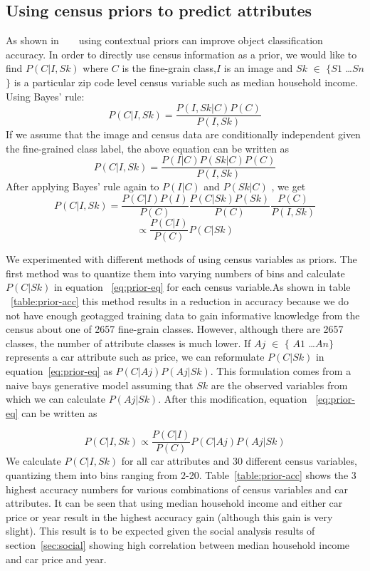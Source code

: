 \documentclass[10pt,twocolumn,letterpaper]{article}
\begin{document}
\subsection{Using census priors to predict attributes}
\label{sec:prior-att}
As shown in ~\cite{birdsnap} ~\cite{Other context stuff} using contextual priors can improve object classification accuracy. In order to directly use census information as a prior, we would like to find \(P(C|I,Sk)\) where \(C\) is the fine-grain class,\(I\) is an image and \(Sk\) \(\in\) \(\{\)\(S1\) \ldots \(Sn\)\(\}\) is a particular zip code level census variable such as median household income. Using Bayes' rule:
\begin{equation}
P(C|I,Sk)=\frac{P(I,Sk|C)P(C)}{P(I,Sk)}
\end{equation}
If we assume that the image and census data are conditionally independent given the fine-grained class label, the above equation can be written as 
\begin{equation}
P(C|I,Sk)=\frac{P(I|C)P(Sk|C)P(C)}{P(I,Sk)}
\end{equation}
After applying Bayes' rule again to \(P(I|C)\) and \(P(Sk|C)\) , we get 
\begin{equation}
P(C|I,Sk)=\frac{P(C|I)P(I)}{P(C)}\frac{P(C|Sk)P(Sk)}{P(C)} \frac{P(C)}{P(I,Sk)}
\end{equation}
\begin{equation}
\propto \frac{P(C|I)}{P(C)}P(C|Sk)
\label{eq:prior-eq}
\end{equation}

We experimented with different methods of using census variables as priors. The first method was to quantize them into varying numbers of bins and calculate \(P(C|Sk)\) in equation ~\ref{eq:prior-eq} for each census variable.As shown in table ~\ref{table:prior-acc} this method results in a reduction in accuracy because we do not have enough geotagged training data to gain informative knowledge from the census about one of 2657 fine-grain classes. However, although there are 2657 classes, the number of attribute classes is much lower. If \(Aj\) \(\in\) \(\{\) \(A1\) \ldots \(An\)\(\}\) represents a car attribute such as price, we can reformulate \(P(C|Sk)\) in equation~\ref{eq:prior-eq} as \(P(C|Aj)\)\(P(Aj|Sk)\). This formulation comes from a naive bays generative model assuming that \(Sk\) are the observed variables from which we can calculate \(P(Aj|Sk)\). After this modification, equation ~\ref{eq:prior-eq} can be written as


\begin{equation}
  P(C|I,Sk) \propto \frac{P(C|I)}{P(C)}P(C|Aj)P(Aj|Sk)
\end{equation}
We calculate \(P(C|I,Sk)\) for all car attributes and 30 different census variables, quantizing them into bins ranging from 2-20. Table~\ref{table:prior-acc} shows the 3 highest accuracy numbers for various combinations of census variables and car attributes. It can be seen that using median household income and either car price or year result in the highest accuracy gain (although this gain is very slight). This result is to be expected given the social analysis results of section~\ref{sec:social} showing high correlation between median household income and car price and year.
\end{document}
